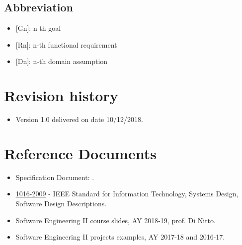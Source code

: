 \subsection{Abbreviation}
\begin{itemize}
    \item {[Gn]}: n-th goal
    \item {[Rn]}: n-th functional requirement
    \item {[Dn]}: n-th domain assumption
\end{itemize}

\section{Revision history}
\begin{itemize}
    \item Version 1.0 delivered on date 10/12/2018.
\end{itemize}

\section{Reference Documents}
\begin{itemize}
    \item Specification Document: . 
    \item \href{https://ieeexplore.ieee.org/document/5167255} {\underline{1016-2009}} - IEEE Standard for Information Technology, Systems Design, Software Design Descriptions.
    \item Software Engineering II course slides, AY 2018-19, prof. Di Nitto.
    \item Software Engineering II projects examples, AY 2017-18 and 2016-17.
\end{itemize}

